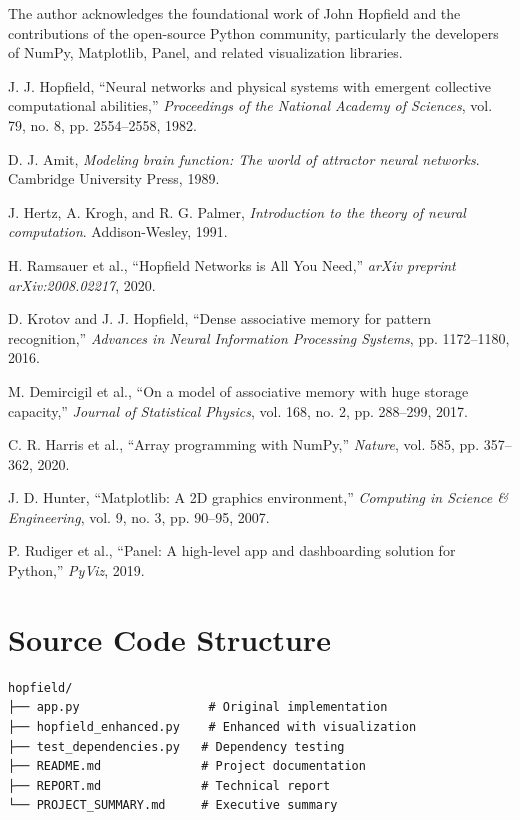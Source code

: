 \documentclass[11pt,a4paper]{article}
\begin{document}
The author acknowledges the foundational work of John Hopfield and the contributions of the open-source Python community, particularly the developers of NumPy, Matplotlib, Panel, and related visualization libraries.


\begin{thebibliography}{9}

J. J. Hopfield, ``Neural networks and physical systems with emergent collective computational abilities,'' \emph{Proceedings of the National Academy of Sciences}, vol. 79, no. 8, pp. 2554--2558, 1982.

D. J. Amit, \emph{Modeling brain function: The world of attractor neural networks}. Cambridge University Press, 1989.

J. Hertz, A. Krogh, and R. G. Palmer, \emph{Introduction to the theory of neural computation}. Addison-Wesley, 1991.

H. Ramsauer et al., ``Hopfield Networks is All You Need,'' \emph{arXiv preprint arXiv:2008.02217}, 2020.

D. Krotov and J. J. Hopfield, ``Dense associative memory for pattern recognition,'' \emph{Advances in Neural Information Processing Systems}, pp. 1172--1180, 2016.

M. Demircigil et al., ``On a model of associative memory with huge storage capacity,'' \emph{Journal of Statistical Physics}, vol. 168, no. 2, pp. 288--299, 2017.

C. R. Harris et al., ``Array programming with NumPy,'' \emph{Nature}, vol. 585, pp. 357--362, 2020.

J. D. Hunter, ``Matplotlib: A 2D graphics environment,'' \emph{Computing in Science \& Engineering}, vol. 9, no. 3, pp. 90--95, 2007.

P. Rudiger et al., ``Panel: A high-level app and dashboarding solution for Python,'' \emph{PyViz}, 2019.

\end{thebibliography}

\appendix

\section{Source Code Structure}

\begin{lstlisting}[caption=Project Structure]
hopfield/
├── app.py                  # Original implementation
├── hopfield_enhanced.py    # Enhanced with visualization
├── test_dependencies.py   # Dependency testing
├── README.md              # Project documentation
├── REPORT.md              # Technical report
└── PROJECT_SUMMARY.md     # Executive summary
\end{lstlisting}
\end{document}
